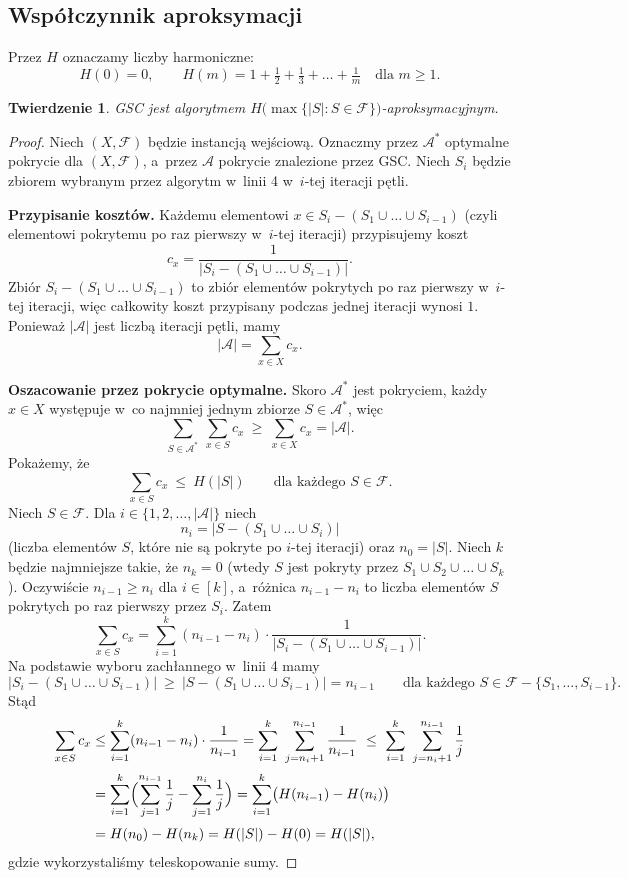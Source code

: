 \documentclass[11pt,a4paper]{article}
\theoremstyle{plain}
\newtheorem{twierdzenie}{Twierdzenie}[section]
\theoremstyle{definition}
\newcommand{\F}{\mathcal{F}}
\newcommand{\Acov}{\mathcal{A}}
\begin{document}
\subsection*{Współczynnik aproksymacji}
Przez $H$ oznaczamy liczby harmoniczne:
\[
H(0)=0,\qquad H(m)=1+\tfrac12+\tfrac13+\dots+\tfrac1m\quad\text{dla }m\ge 1.
\]

\begin{twierdzenie}\label{tw:gsc}
\textsc{GSC} jest algorytmem $H\!\bigl(\max\{|S|:S\in\F\}\bigr)$-aproksymacyjnym.
\end{twierdzenie}

\begin{proof}
Niech $(X,\F)$ będzie instancją wejściową. Oznaczmy przez $\Acov^{*}$ optymalne
pokrycie dla $(X,\F)$, a~przez $\Acov$ pokrycie znalezione przez \textsc{GSC}.
Niech $S_i$ będzie zbiorem wybranym przez algorytm w~linii 4 w~$i$-tej iteracji pętli.

\medskip
\noindent\textbf{Przypisanie kosztów.} Każdemu elementowi
$x\in S_i-(S_1\cup\dots\cup S_{i-1})$ (czyli elementowi pokrytemu po raz pierwszy
w~$i$-tej iteracji) przypisujemy koszt
\[
c_x=\frac{1}{\bigl|S_i-(S_1\cup\dots\cup S_{i-1})\bigr|}.
\]
Zbiór $S_i-(S_1\cup\dots\cup S_{i-1})$ to zbiór elementów pokrytych po raz pierwszy
w~$i$-tej iteracji, więc całkowity koszt przypisany podczas jednej iteracji wynosi $1$.
Ponieważ $|\Acov|$ jest liczbą iteracji pętli, mamy
\[
|\Acov|=\sum_{x\in X}c_x.
\]

\medskip
\noindent\textbf{Oszacowanie przez pokrycie optymalne.} Skoro $\Acov^{*}$ jest pokryciem,
każdy $x\in X$ występuje w~co najmniej jednym zbiorze $S\in\Acov^{*}$, więc
\[
\sum_{S\in\Acov^{*}}\ \sum_{x\in S}c_x\ \ge\ \sum_{x\in X}c_x=|\Acov|.
\]
Pokażemy, że
\[
\sum_{x\in S}c_x\ \le\ H(|S|)\qquad\text{dla każdego }S\in\F.
\]
Niech $S\in\F$. Dla $i\in\{1,2,\dots,|\Acov|\}$ niech
\[
n_i=\bigl|S-(S_1\cup\dots\cup S_i)\bigr|
\]
(liczba elementów $S$, które nie są pokryte po $i$-tej iteracji) oraz $n_0=|S|$.
Niech $k$ będzie najmniejsze takie, że $n_k=0$ (wtedy $S$ jest pokryty przez
$S_1\cup S_2\cup\dots\cup S_k$). Oczywiście $n_{i-1}\ge n_i$ dla $i\in[k]$, a~różnica
$n_{i-1}-n_i$ to liczba elementów $S$ pokrytych po raz pierwszy przez $S_i$. Zatem
\[
\sum_{x\in S}c_x=\sum_{i=1}^{k}(n_{i-1}-n_i)\cdot
\frac{1}{\bigl|S_i-(S_1\cup\dots\cup S_{i-1})\bigr|}.
\]
Na podstawie wyboru zachłannego w~linii 4 mamy
\[
\bigl|S_i-(S_1\cup\dots\cup S_{i-1})\bigr|\ \ge\
\bigl|S-(S_1\cup\dots\cup S_{i-1})\bigr|=n_{i-1}
\qquad\text{dla każdego }S\in\F-\{S_1,\dots,S_{i-1}\}.
\]
Stąd
\begin{align*}
\sum_{x\in S}c_x
&\le\sum_{i=1}^{k}(n_{i-1}-n_i)\cdot\frac{1}{n_{i-1}}
=\sum_{i=1}^{k}\ \sum_{j=n_i+1}^{n_{i-1}}\frac{1}{n_{i-1}}
\ \le\ \sum_{i=1}^{k}\ \sum_{j=n_i+1}^{n_{i-1}}\frac{1}{j}\\[2pt]
&=\sum_{i=1}^{k}\Bigl(\sum_{j=1}^{n_{i-1}}\frac1j-\sum_{j=1}^{n_i}\frac1j\Bigr)
=\sum_{i=1}^{k}\bigl(H(n_{i-1})-H(n_i)\bigr)\\[2pt]
&=H(n_0)-H(n_k)=H(|S|)-H(0)=H(|S|),
\end{align*}
gdzie wykorzystaliśmy teleskopowanie sumy.


\end{proof}
\end{document}
